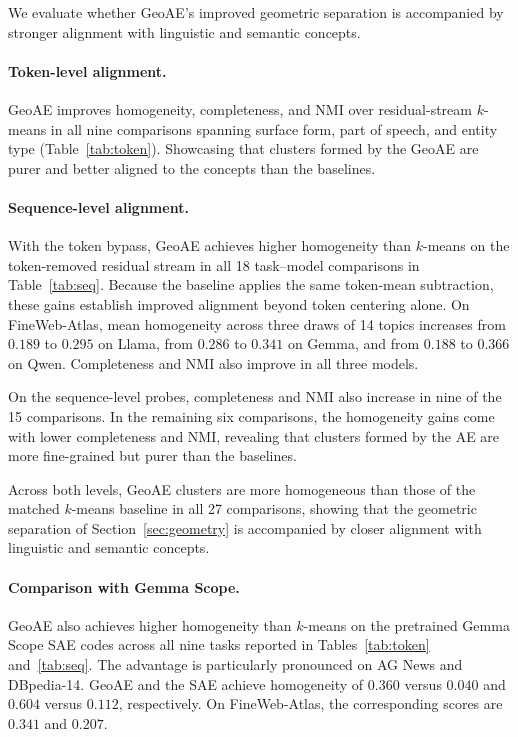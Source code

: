\documentclass[11pt]{article}
\begin{document}
We evaluate whether GeoAE's improved geometric separation is accompanied by stronger alignment with linguistic and semantic concepts.

\paragraph{Token-level alignment.}
GeoAE improves homogeneity, completeness, and NMI over residual-stream $k$-means in all nine comparisons spanning surface form, part of speech, and entity type (Table~\ref{tab:token}). Showcasing that clusters formed by the GeoAE are purer and better aligned to the concepts than the baselines. 

\paragraph{Sequence-level alignment.}
With the token bypass, GeoAE achieves higher homogeneity than $k$-means on the token-removed residual stream in all 18 task--model comparisons in Table~\ref{tab:seq}.
Because the baseline applies the same token-mean subtraction, these gains establish improved alignment beyond token centering alone.
On FineWeb-Atlas, mean homogeneity across three draws of 14 topics increases from $0.189$ to $0.295$ on Llama, from $0.286$ to $0.341$ on Gemma, and from $0.188$ to $0.366$ on Qwen. Completeness and NMI also improve in all three models.

On the sequence-level probes, completeness and NMI also increase in nine of the 15 comparisons. In the remaining six comparisons, the homogeneity gains come with lower completeness and NMI, revealing that clusters formed by the AE are more fine-grained but purer than the baselines.

Across both levels, GeoAE clusters are more homogeneous than those of the matched $k$-means baseline in all 27 comparisons, showing that the geometric separation of Section~\ref{sec:geometry} is accompanied by closer alignment with linguistic and semantic concepts.

\paragraph{Comparison with Gemma Scope.}
GeoAE also achieves higher homogeneity than $k$-means on the pretrained Gemma Scope SAE codes across all nine tasks reported in Tables~\ref{tab:token} and~\ref{tab:seq}.
The advantage is particularly pronounced on AG News and DBpedia-14. GeoAE and the SAE achieve homogeneity of $0.360$ versus $0.040$ and $0.604$ versus $0.112$, respectively.
On FineWeb-Atlas, the corresponding scores are $0.341$ and $0.207$.
\end{document}
